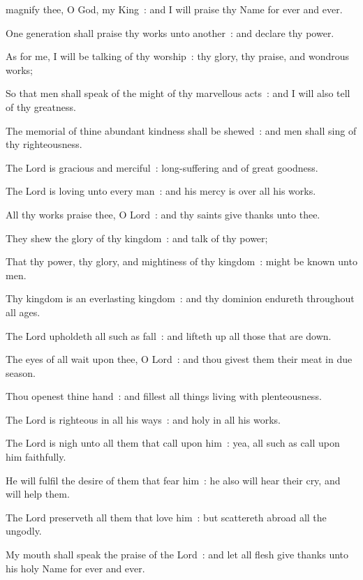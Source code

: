  magnify thee, O God, my King~: and I will praise thy Name for ever and ever.\par
{}
One generation shall praise thy works unto another~: and declare thy power.\par
{}As for me, I will be talking of thy worship~: thy glory, thy praise, and wondrous works;\par
{}So that men shall speak of the might of thy marvellous acts~: and I will also tell of thy greatness.\par
{}The memorial of thine abundant kindness shall be shewed~: and men shall sing of thy righteousness.\par
{}The Lord is gracious and merciful~: long-suffering and of great goodness.\par
{}The Lord is loving unto every man~: and his mercy is over all his works.\par
{}All thy works praise thee, O Lord~: and thy saints give thanks unto thee.\par
{}They shew the glory of thy kingdom~: and talk of thy power;\par
{}That thy power, thy glory, and mightiness of thy kingdom~: might be known unto men.\par
{}Thy kingdom is an everlasting kingdom~: and thy dominion endureth throughout all ages.\par
{}The Lord upholdeth all such as fall~: and lifteth up all those that are down.\par
{}The eyes of all wait upon thee, O Lord~: and thou givest them their meat in due season.\par
{}Thou openest thine hand~: and fillest all things living with plenteousness.\par
{}The Lord is righteous in all his ways~: and holy in all his works.\par
{}The Lord is nigh unto all them that call upon him~: yea, all such as call upon him faithfully.\par
{}He will fulfil the desire of them that fear him~: he also will hear their cry, and will help them.\par
{}The Lord preserveth all them that love him~: but scattereth abroad all the ungodly.\par
{}My mouth shall speak the praise of the Lord~: and let all flesh give thanks unto his holy Name for ever and ever.\par


